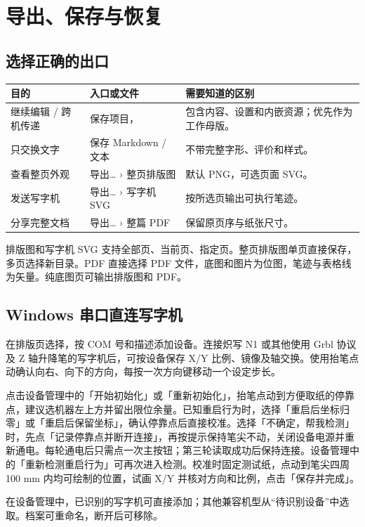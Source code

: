 \chapter{导出、保存与恢复}\label{ch:export}
\section{选择正确的出口}
\par\noindent\begin{tabularx}{\linewidth}{@{}P{33mm}P{39mm}Y@{}}
\toprule
目的 & 入口或文件 & 需要知道的区别\\\midrule
继续编辑 / 跨机传递 & 保存项目， & 包含内容、设置和内嵌资源；优先作为工作母版。\\
只交换文字 & 保存 Markdown / 文本 & 不带完整字形、评价和样式。\\
查看整页外观 & 导出… › 整页排版图 & 默认 PNG，可选页面 SVG。\\
发送写字机 & 导出… › 写字机 SVG & 按所选页输出可执行笔迹。\\
分享完整文档 & 导出… › 整篇 PDF & 保留原页序与纸张尺寸。\\
\bottomrule
\end{tabularx}

排版图和写字机 SVG 支持全部页、当前页、指定页。整页排版图单页直接保存，多页选择新目录。PDF 直接选择 PDF 文件，底图和图片为位图，笔迹与表格线为矢量。纯底图页可输出排版图和 PDF。

\section{Windows 串口直连写字机}

在排版页选择，按 COM 号和描述添加设备。连接炽写 N1 或其他使用 Grbl 协议及 Z 轴升降笔的写字机后，可按设备保存 X/Y 比例、镜像及轴交换。使用抬笔点动确认向右、向下的方向，每按一次方向键移动一个设定步长。

点击设备管理中的「开始初始化」或「重新初始化」，抬笔点动到方便取纸的停靠点，建议选机器左上方并留出限位余量。已知重启行为时，选择「重启后坐标归零」或「重启后保留坐标」，确认停靠点后直接校准。选择「不确定，帮我检测」时，先点「记录停靠点并断开连接」，再按提示保持笔尖不动，关闭设备电源并重新通电。每轮通电后只需点一次主按钮；第三轮读取成功后保持连接。设备管理中的「重新检测重启行为」可再次进入检测。校准时固定测试纸，点动到笔尖四周 100 mm 内均可绘制的位置，试画 X/Y 并核对方向和比例，点击「保存并完成」。

在设备管理中，已识别的写字机可直接添加；其他兼容机型从“待识别设备”中选取。档案可重命名，断开后可移除。

